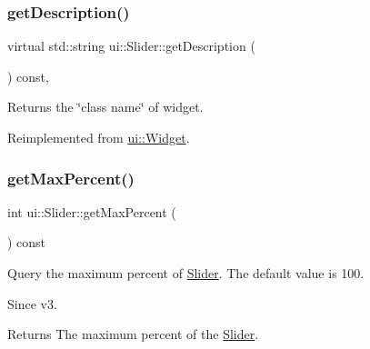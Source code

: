 \mbox{\label{classui_1_1Slider_a064d37cc091783546ed36b4a0b7e4ca5}} 
\subsubsection{\texorpdfstring{get\+Description()}{getDescription()}\hspace{0.1cm}{\footnotesize\ttfamily [2/2]}}
{\footnotesize\ttfamily virtual std\+::string ui\+::\+Slider\+::get\+Description (\begin{DoxyParamCaption}{ }\end{DoxyParamCaption}) const\hspace{0.3cm}{\ttfamily [override]}, {\ttfamily [virtual]}}

Returns the \char`\"{}class name\char`\"{} of widget. 

Reimplemented from \hyperlink{classui_1_1Widget_ad85abdaa9133dc6b8efc32670ae9b93f}{ui\+::\+Widget}.

\mbox{\label{classui_1_1Slider_a9938f947d4e314d3447f7d2375cad373}} 
\subsubsection{\texorpdfstring{get\+Max\+Percent()}{getMaxPercent()}\hspace{0.1cm}{\footnotesize\ttfamily [1/2]}}
{\footnotesize\ttfamily int ui\+::\+Slider\+::get\+Max\+Percent (\begin{DoxyParamCaption}{ }\end{DoxyParamCaption}) const}

Query the maximum percent of \hyperlink{classui_1_1Slider}{Slider}. The default value is 100. \begin{DoxySince}{Since}
v3. 
\end{DoxySince}
\begin{DoxyReturn}{Returns}
The maximum percent of the \hyperlink{classui_1_1Slider}{Slider}. 
\end{DoxyReturn}
\mbox{\label{classui_1_1Slider_a9938f947d4e314d3447f7d2375cad373}} 
